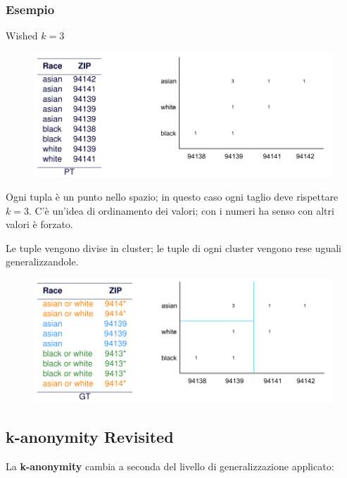\documentclass{report}
\begin{document}
\newpage
\subsubsection{Esempio}
Wished $k = 3$
\begin{figure}[ht]
    \centering
    \includegraphics[width=1\linewidth]{images/mondrian1.png}
\end{figure}

\noindent Ogni tupla è un punto nello spazio; in questo caso ogni taglio deve rispettare $k=3$.
C'è un'idea di ordinamento dei valori; con i numeri ha senso con altri valori è forzato.

Le tuple vengono divise in cluster; le tuple di ogni cluster vengono rese uguali generalizzandole.

\begin{figure}[ht]
    \centering
    \includegraphics[width=1\linewidth]{images/mondrian2.png}
\end{figure}

\subsection{k-anonymity Revisited}
La \textbf{k-anonymity} cambia a seconda del livello di generalizzazione applicato:
\end{document}
